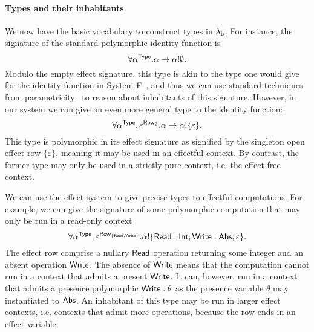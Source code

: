 \documentclass[12pt,phd,lfcs,twoside,openright,logo,leftchapter,normalheadings]{infthesis}
\theoremstyle{plain}
\theoremstyle{definition}
\begin{document}

\paragraph{Types and their inhabitants}
We now have the basic vocabulary to construct types in $\lambda_{\mathsf{b}}$. For
instance, the signature of the standard polymorphic identity function
is
%
\[
  \forall \alpha^{\mathsf{Type}}. \alpha \to \alpha ! \emptyset.
\]
%
Modulo the empty effect signature, this type is akin to the type one
would give for the identity function in System
F~\cite{Girard72,Reynolds74}, and thus we can use standard techniques
from parametricity~\cite{Wadler89} to reason about inhabitants of this
signature. However, in our system we can give an even more general
type to the identity function:
%
\[
  \forall \alpha^{\mathsf{Type}},\varepsilon^{\mathsf{Row}_\emptyset}. \alpha \to \alpha ! \{\varepsilon\}.
\]
%
This type is polymorphic in its effect signature as signified by the
singleton open effect row $\{\varepsilon\}$, meaning it may be used in
an effectful context. By contrast, the former type may only be used in
a strictly pure context, i.e. the effect-free context.
%
%

We can use the effect system to give precise types to effectful
computations. For example, we can give the signature of some
polymorphic computation that may only be run in a read-only context
%
\[
  \forall \alpha^{\mathsf{Type}}, \varepsilon^{\mathsf{Row}_{\{\mathsf{Read},\mathsf{Write}\}}}. \alpha ! \{\mathsf{Read}:\mathsf{Int};\mathsf{Write}:\mathsf{Abs};\varepsilon\}.
\]
%
The effect row comprise a nullary $\mathsf{Read}$ operation returning some
integer and an absent operation $\mathsf{Write}$. The absence of $\mathsf{Write}$
means that the computation cannot run in a context that admits a
present $\mathsf{Write}$.  It can, however, run in a context that admits a
presence polymorphic $\mathsf{Write} : \theta$ as the presence variable
$\theta$ may instantiated to $\mathsf{Abs}$. An inhabitant of this type may be
run in larger effect contexts, i.e. contexts that admit more
operations, because the row ends in an effect variable.
%
\end{document}
